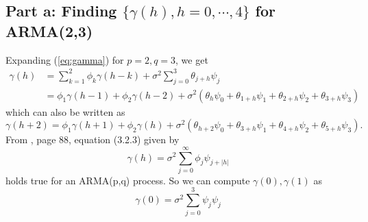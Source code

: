 \documentclass[11pt, oneside]{article}   	%
\begin{document}
\subsection{Part a: Finding $\{ \gamma(h), h = 0, \cdots, 4\}$ for  ARMA(2,3)}
Expanding (\ref{eq:gamma})  for $p=2, q=3$, we get
\begin{equation}
\begin{aligned}
\gamma(h) &= \sum_{k=1}^{2}\phi_{k}\gamma(h-k) + \sigma^{2}\sum_{j=0}^{3}\theta_{j+h}\psi_{j}\\
&=\phi_{1}\gamma(h-1) + \phi_{2}\gamma(h-2) + \sigma^{2}(\theta_{h}\psi_{0} + \theta_{1+h}\psi_{1} + \theta_{2+h}\psi_{2}+\theta_{3+h}\psi_{3} )
\end{aligned}
\end{equation}
which can also be written as 
\begin{equation}\label{eq:gamma0}
\gamma(h+2) = \phi_{1}\gamma(h+1) + \phi_{2}\gamma(h) + \sigma^{2}(\theta_{h+2}\psi_{0} + \theta_{3+h}\psi_{1} + \theta_{4+h}\psi_{2}+\theta_{5+h}\psi_{3} ).
\end{equation}
From \cite{petter}, page 88, equation (3.2.3) given by
\begin{equation}
\gamma(h) = \sigma^{2}\sum_{j=0}^{\infty}\phi_{j}\psi_{j+|h|}
\end{equation}
holds true for an ARMA(p,q) process. So we can compute $\gamma(0), \gamma(1)$ as 
\begin{equation}
\gamma(0) =  \sigma^{2}\sum_{j=0}^{3}\psi_{j}\psi_{j}
\end{equation}
\end{document}
